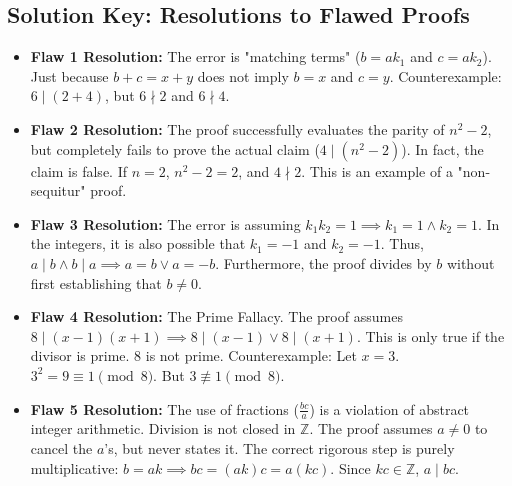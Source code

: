 \documentclass[11pt]{article}
\theoremstyle{definition}
\theoremstyle{remark}
\newcommand{\Z}{\mathbb{Z}}
\begin{document}
\subsection{Solution Key: Resolutions to Flawed Proofs}
\begin{itemize}
    \item \textbf{Flaw 1 Resolution:} The error is "matching terms" ($b = ak_1$ and $c = ak_2$). Just because $b+c = x+y$ does not imply $b=x$ and $c=y$. Counterexample: $6 \mid (2+4)$, but $6 \nmid 2$ and $6 \nmid 4$.
    \item \textbf{Flaw 2 Resolution:} The proof successfully evaluates the parity of $n^2 - 2$, but completely fails to prove the actual claim ($4 \mid (n^2 - 2)$). In fact, the claim is false. If $n=2$, $n^2-2 = 2$, and $4 \nmid 2$. This is an example of a "non-sequitur" proof.
    \item \textbf{Flaw 3 Resolution:} The error is assuming $k_1 k_2 = 1 \implies k_1 = 1 \land k_2 = 1$. In the integers, it is also possible that $k_1 = -1$ and $k_2 = -1$. Thus, $a \mid b \land b \mid a \implies a = b \lor a = -b$. Furthermore, the proof divides by $b$ without first establishing that $b \neq 0$.
    \item \textbf{Flaw 4 Resolution:} The Prime Fallacy. The proof assumes $8 \mid (x-1)(x+1) \implies 8 \mid (x-1) \lor 8 \mid (x+1)$. This is only true if the divisor is prime. $8$ is not prime. Counterexample: Let $x=3$. $3^2 = 9 \equiv 1 \pmod 8$. But $3 \not\equiv 1 \pmod 8$.
    \item \textbf{Flaw 5 Resolution:} The use of fractions ($\frac{bc}{a}$) is a violation of abstract integer arithmetic. Division is not closed in $\Z$. The proof assumes $a \neq 0$ to cancel the $a$'s, but never states it. The correct rigorous step is purely multiplicative: $b = ak \implies bc = (ak)c = a(kc)$. Since $kc \in \Z$, $a \mid bc$.
\end{itemize}
\end{document}
